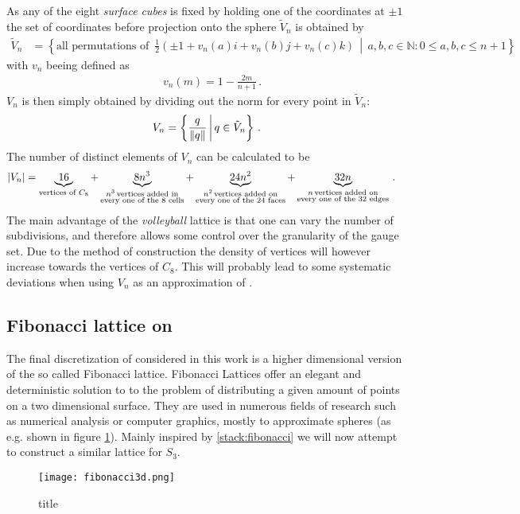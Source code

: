 As any of the eight \emph{surface cubes} is fixed by holding one of the coordinates at $\pm 1$ the set of coordinates before projection onto the sphere $\tilde{V}_n$ is obtained by
\begin{align*}
 \tilde{V}_n & = \left\{ \textrm{all permutations of }  \, \frac{1}{2} \left( \pm 1 + v_n(a) i + v_n(b) j + v_n(c) k \right)  \, \middle| \, a,b,c \in \mathbb{N}: 0 \le a,b,c \le n+1 \right\}
\end{align*}
with $v_n$ beeing defined as
\begin{align*}
 \quad v_n(m)  =  1-\frac{2m}{n+1} \, \textrm{.}
\end{align*}
$V_n$ is then simply obtained by dividing out the norm for every point in $\tilde{V}_n$:
\begin{align*}
 V_n = \left\{\frac{q}{\norm{q}} \, \middle| \,  q \in \tilde{V}_n \right\} \, \textrm{.}
\end{align*}
The number of distinct elements of $V_n$ can be calculated to be
\begin{align*}
 \abs{V_n} & = \underbrace{16}_{\substack{ \textrm{vertices of } C_8
 }} + \underbrace{8 n^3}_{\substack{n^3 \, \textrm{vertices added in} \\ \textrm{every one of the 8 cells}}} + \underbrace{24 n^2}_{\substack{n^2 \, \textrm{vertices added on} \\ \textrm{every one of the 24 faces}}} + \underbrace{32 n}_{\substack{n \, \textrm{vertices added on} \\ \textrm{every one of the 32 edges}}} \, \textrm{.}
\end{align*}
The main advantage of the \emph{volleyball} lattice is that one can vary the number of subdivisions, and therefore allows some control over the granularity of the gauge set. Due to the method of construction the density of vertices will however increase towards the vertices of $C_8$. This will probably lead to some systematic deviations when using $V_n$ as an approximation of \SUTwo.

\subsection{Fibonacci lattice on \SUTwo}

The final discretization of \SUTwo considered in this work is a higher dimensional version of the so called Fibonacci lattice. Fibonacci Lattices offer an elegant and deterministic solution to to the problem of distributing a given amount of points on a two dimensional surface. They are used in numerous fields of research such as numerical analysis or computer graphics, mostly to approximate spheres (as e.g. shown in figure \ref{fig:fibonacciPic}). Mainly inspired by \ref{stack:fibonacci} we will now attempt to construct a similar lattice for $S_3$.\\
\begin{figure}
 \centering
 \texttt{[image: fibonacci3d.png]}
 \caption{title}
 \label{fig:fibonacciPic}
\end{figure}


